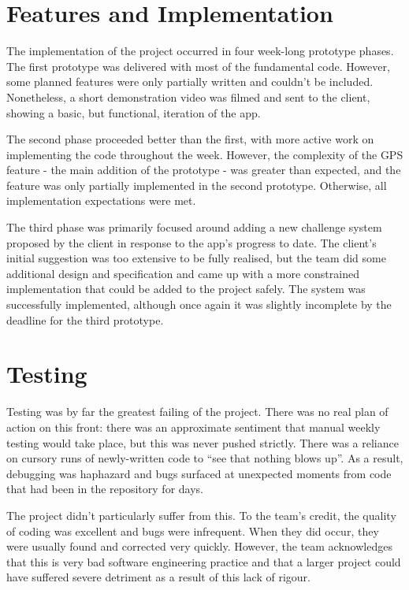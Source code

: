 \documentclass[12pt,a4paper,twoside]{article}
\begin{document}
\section{Features and Implementation}

The implementation of the project occurred in four week-long prototype phases. 
The first prototype was delivered with most of the fundamental code. 
However, some planned features were only partially written and couldn't be included. 
Nonetheless, a short demonstration video was filmed and sent to the client, showing a basic, but functional, iteration of the app.

The second phase proceeded better than the first, with more active work on implementing the code throughout the week. 
However, the complexity of the GPS feature - the main addition of the prototype - was greater than expected, and the feature was only partially implemented in the second prototype. 
Otherwise, all implementation expectations were met.

The third phase was primarily focused around adding a new challenge system proposed by the client in response to the app's progress to date. 
The client's initial suggestion was too extensive to be fully realised, but the team did some additional design and specification and came up with a more constrained implementation that could be added to the project safely. 
The system was successfully implemented, although once again it was slightly incomplete by the deadline for the third prototype.

\section{Testing}

Testing was by far the greatest failing of the project. 
There was no real plan of action on this front: there was an approximate sentiment that manual weekly testing would take place, but this was never pushed strictly. 
There was a reliance on cursory runs of newly-written code to ``see that nothing blows up''. 
As a result, debugging was haphazard and bugs surfaced at unexpected moments from code that had been in the repository for days.

The project didn't particularly suffer from this. 
To the team's credit, the quality of coding was excellent and bugs were infrequent. 
When they did occur, they were usually found and corrected very quickly. 
However, the team acknowledges that this is very bad software engineering practice and that a larger project could have suffered severe detriment as a result of this lack of rigour.
\end{document}
